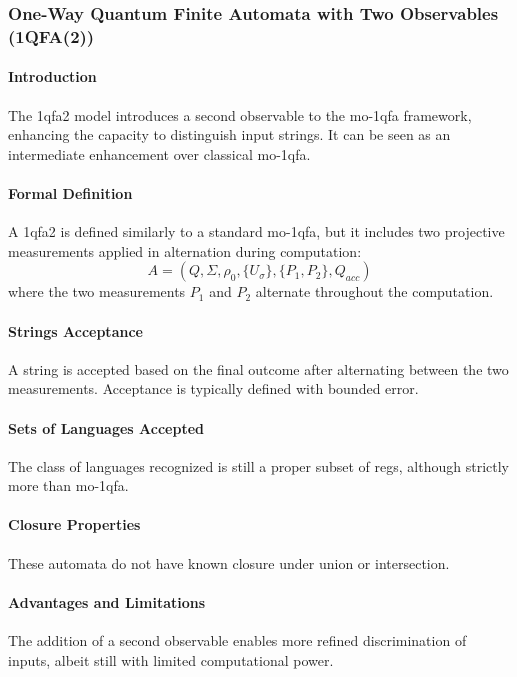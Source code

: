 \subsubsection{One-Way Quantum Finite Automata with Two Observables (1QFA(2))}
\paragraph{Introduction}
The \gls{1qfa2} model introduces a second observable to the \gls{mo-1qfa} framework, enhancing the capacity to distinguish input strings. It can be seen as an intermediate enhancement over classical \gls{mo-1qfa}.

\paragraph{Formal Definition}
A \gls{1qfa2} is defined similarly to a standard \gls{mo-1qfa}, but it includes two projective measurements applied in alternation during computation:
\[
A = (Q, \Sigma, \rho_0, \{U_{\sigma}\}, \{P_1, P_2\}, Q_{acc})
\]
where the two measurements \( P_1 \) and \( P_2 \) alternate throughout the computation.

\paragraph{Strings Acceptance}
A string is accepted based on the final outcome after alternating between the two measurements. Acceptance is typically defined with bounded error.

\paragraph{Sets of Languages Accepted}
The class of languages recognized is still a proper subset of \glspl{reg}, although strictly more than \gls{mo-1qfa}.

\paragraph{Closure Properties}
These automata do not have known closure under union or intersection.

\paragraph{Advantages and Limitations}
The addition of a second observable enables more refined discrimination of inputs, albeit still with limited computational power.

